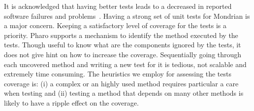 \documentclass[runningheads]{llncs}
\newcommand{\figref}[1]{Figure~\ref{fig:#1}}
\newcommand{\tablabel}[1]{\label{tab:#1}}
\begin{document}
%
%
%
%

It is acknowledged that having better tests leads to a decreased in reported software failures and problems~\cite{Mock09a}. Having a strong set of unit tests for Mondrian is a major concern. Keeping a satisfactory level of coverage for the tests is a priority. Pharo supports a mechanism to identify the method executed by the tests. Though useful to know what are the components ignored by the tests, it does not give hint on how to increase the coverage. Sequentially going through each uncovered method and writing a new test for it is tedious, not scalable and extremely time consuming. The heuristics we employ for assessing the tests coverage is: (i) a complex or an highly used method requires particular a care when testing and (ii) testing a method that depends on many other methods is likely to have a ripple effect on the coverage.
\end{document}

